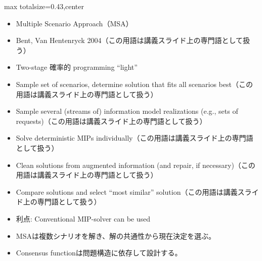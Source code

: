 \clearpage
{}
\begin{minipage}[t]{0.405\textwidth}
\begin{adjustbox}{max totalsize={\textwidth}{0.43\textheight},center}
\begin{minipage}{\textwidth}\scriptsize
{}\begin{itemize}
\item Multiple Scenario Approach（MSA）
\item Bent, Van Hentenryck 2004（この用語は講義スライド上の専門語として扱う）
\item Two-stage 確率的 programming “light”
\item Sample set of scenarios, determine solution that fits all scenarios best（この用語は講義スライド上の専門語として扱う）
\item Sample several (streams of) information model realizations (e.g., sets of requests)（この用語は講義スライド上の専門語として扱う）
\item Solve deterministic MIPs individually（この用語は講義スライド上の専門語として扱う）
\item Clean solutions from augmented information (and repair, if necessary)（この用語は講義スライド上の専門語として扱う）
\item Compare solutions and select “most similar” solution（この用語は講義スライド上の専門語として扱う）
\item 利点: Conventional MIP-solver can be used
\end{itemize}\begin{itemize}
\item MSAは複数シナリオを解き、解の共通性から現在決定を選ぶ。
\item Consensus functionは問題構造に依存して設計する。
\end{itemize}
\end{minipage}
\end{adjustbox}
\end{minipage}\hfill
